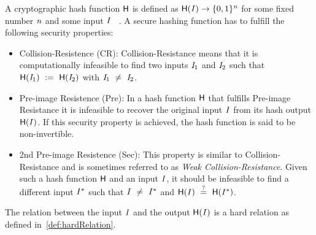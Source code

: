 \begin{definition}\label{def:hashFunction}
    A cryptographic hash function $\mathsf{H}$ is defined as $\mathsf{H} (\mathit{I}) \rightarrow \{0,1\}^{\mathit{n}}$ for some fixed number $\mathit{n}$ and some input $\mathit{I}$ ~\cite{al2011cryptographic}.
    A secure hashing function has to fulfill the following security properties:
    \begin{itemize}
        \item Collision-Resistence (CR): Collision-Resistance means that it is computationally infeasible to find two inputs $\mathit{I}_1$ and $\mathit{I}_2$ such that
        $\mathsf{H} (\mathit{I}_1) ~:=~ \mathsf{H} (\mathit{I}_2)$ with $\mathit{I}_1 ~\neq~ \mathit{I}_2$.
        \item Pre-image Resistence (Pre): In a hash function $\mathsf{H}$ that fulfills Pre-image Resistance it is infeasible to recover the original input $\mathit{I}$ from its hash output $\mathsf{H} (\mathit{I})$.
        If this security property is achieved, the hash function is said to be non-invertible.
        \item 2nd Pre-image Resistence (Sec):  This property is similar to Collision-Resistance and is sometimes referred to as \textit{Weak Collision-Resistance}.
        Given such a hash function $\mathsf{H}$ and an input $\mathit{I}$, it should be infeasible to find a different input $\mathit{I}^*$ such that $\mathit{I} ~\neq~ \mathit{I}^*$
        and $\mathsf{H} (\mathit{I}) ~\stackrel{?}{=}~ \mathsf{H} (\mathit{I}^*)$.
    \end{itemize}
    The relation between the input $\mathit{I}$ and the output $\mathsf{H} (\mathit{I})$ is a hard relation as defined in~\ref{def:hardRelation}.
\end{definition}

